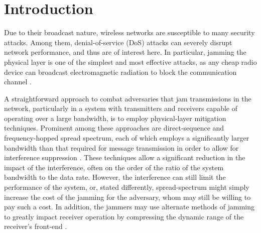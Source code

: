 \documentclass[10pt,journal]{IEEEtran}
\theoremstyle{definition}
\begin{document}
\section{Introduction}\label{sec:intro}
Due to their broadcast nature, wireless networks  are susceptible to many security attacks. Among them, denial-of-service (DoS) attacks can severely disrupt network performance, and thus are of  interest here. In particular, jamming the physical layer is one of the simplest and most effective attacks, as any cheap radio device can broadcast electromagnetic radiation to block the communication channel \cite{pelechrinis2011denial}.

A straightforward approach to combat adversaries that jam transmissions in the network, particularly in a system with transmitters and receivers capable of operating over a large bandwidth, is to employ physical-layer mitigation techniques. Prominent among these approaches are direct-sequence and frequency-hopped spread spectrum, each of which employs a significantly larger bandwidth than that required for message transmission in order to allow for interference suppression \cite{proakis2000digital,peterson1995introduction}.  
These techniques allow a significant reduction in the impact of the interference, often on the order of the ratio of the system bandwidth to the data rate.  However, the interference can still limit the performance of the system, or, stated differently, spread-spectrum might simply increase the cost of the jamming for the adversary, whom may still be willing to pay such a cost. In addition, the jammers may use alternate methods of jamming to   greatly impact receiver operation by compressing the dynamic range
of the receiver’s front-end \cite{sheikholeslami2014everlasting}.
\end{document}

